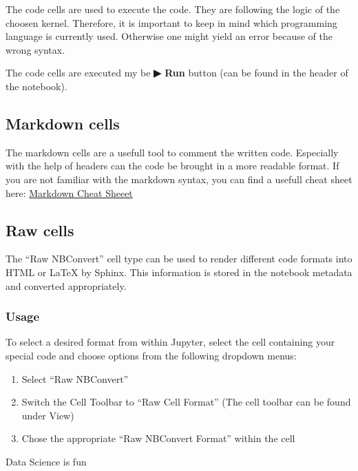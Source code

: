 \documentclass[
  letterpaper,
  DIV=11,
  numbers=noendperiod]{scrreprt}
\providecommand{\tightlist}{%
  \setlength{\itemsep}{0pt}\setlength{\parskip}{0pt}}\usepackage{longtable,booktabs,array}
\begin{document}
The code cells are used to execute the code. They are following the
logic of the choosen kernel. Therefore, it is important to keep in mind
which programming language is currently used. Otherwise one might yield
an error because of the wrong syntax.

The code cells are executed my be \textbf{▶ Run} button (can be found in
the header of the notebook).

\hypertarget{markdown-cells}{%
\subsection{Markdown cells}\label{markdown-cells}}

The markdown cells are a usefull tool to comment the written code.
Especially with the help of headers can the code be brought in a more
readable format. If you are not familiar with the markdown syntax, you
can find a usefull cheat sheet here:
\href{https://www.ibm.com/docs/en/db2-event-store/2.0.0?topic=notebooks-markdown-jupyter-cheatsheet}{Markdown
Cheat Sheeet}

\hypertarget{raw-cells}{%
\subsection{Raw cells}\label{raw-cells}}

The ``Raw NBConvert'' cell type can be used to render different code
formats into HTML or LaTeX by Sphinx. This information is stored in the
notebook metadata and converted appropriately.

\hypertarget{usage}{%
\subsubsection{Usage}\label{usage}}

To select a desired format from within Jupyter, select the cell
containing your special code and choose options from the following
dropdown menus:

\begin{enumerate}
\def\labelenumi{\arabic{enumi}.}
\tightlist
\item
  Select ``Raw NBConvert''
\item
  Switch the Cell Toolbar to ``Raw Cell Format'' (The cell toolbar can
  be found under View)
\item
  Chose the appropriate ``Raw NBConvert Format'' within the cell
\end{enumerate}

Data Science is fun
\end{document}
